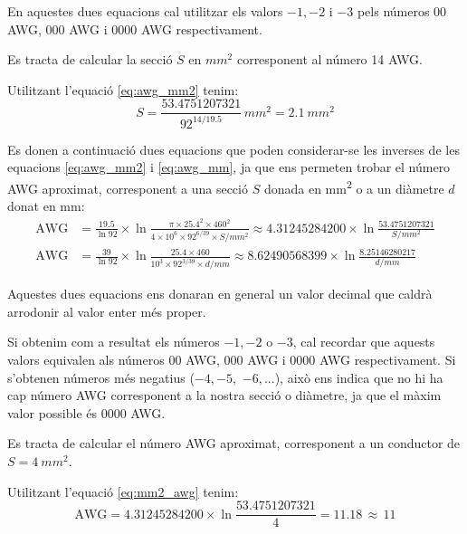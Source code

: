 En aquestes dues equacions cal utilitzar els valors $-1, -2$ i $-3$  pels números 00 AWG,
000 AWG i 0000 AWG respectivament.


\begin{exemple}\label{ex:AWGammSQ}
	\addcontentsxms{\AWGammSQ}
    Es tracta de calcular la secció $S$ en $\unit{mm^2}$ corresponent al número 14 AWG.

    Utilitzant l'equació \eqref{eq:awg_mm2} tenim:
    \[
        S = \dfrac{\num{53,4751207321}}{92^{14/\num{19,5}}} 
        \,\unit{mm^2} = \qty{2,1}{mm^2}
    \]
\end{exemple}


Es donen a continuació dues equacions que poden considerar-se les inverses de les equacions \eqref{eq:awg_mm2} i \eqref{eq:awg_mm}, ja que ens permeten trobar el número AWG aproximat, corresponent a una secció $S$ donada en \unit{mm^2} o a un diàmetre $d$ donat en \unit{mm}:
\begin{align}
   \text{AWG} &= \frac{\num{19,5}}{\ln 92} \times \ln \frac{\pi \times
   \num{25,4}^2 \times 460^2}{4 \times 10^6 \times 92^{6/39} \times S/{\scriptstyle\unit{mm^2}}} \approx
   \num{4,31245284200} \times \ln \frac{\num{53,4751207321}}{S/{\scriptstyle\unit{mm^2}}}\label{eq:mm2_awg} \\[2ex]
   \text{AWG} &= \frac{39}{\ln 92} \times \ln \frac{\num{25,4} \times 460}{10^3 \times 92^{3/39} \times d/{\scriptstyle\unit{mm}}} \approx
   \num{8,62490568399} \times \ln \frac{\num{8,25146280217}}{d/{\scriptstyle\unit{mm}}}\label{eq:mm_awg}
\end{align}

Aquestes dues equacions ens donaran en general un valor decimal que caldrà arrodonir al valor enter  més proper.

Si obtenim com a resultat els números $-1, -2$ o $-3$, cal recordar que aquests valors equivalen als números 00 AWG,
000 AWG i 0000 AWG respectivament. Si s'obtenen números més negatius ($-4, -5,$ $-6, ...$), això ens indica que no hi ha cap número AWG corresponent a la nostra secció o diàmetre, ja que el màxim valor possible és 0000 AWG.



\begin{exemple}\label{ex:mmSQaAWG}
	\addcontentsxms{\mmSQaAWG}
    Es tracta de calcular el número AWG aproximat, corresponent a un conductor de $S=\qty{4}{mm^2}$.

    Utilitzant l'equació \eqref{eq:mm2_awg} tenim:
    \[
        \text{AWG} = \num{4,31245284200} \times \ln \dfrac{\num{53,4751207321}}{4} =
        \num{11,18} \, \approx \, 11
    \]
\end{exemple}


